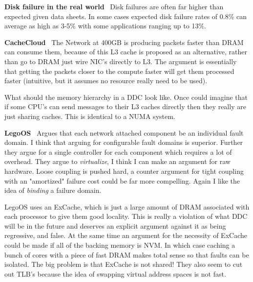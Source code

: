 \textbf{Disk failure in the real
world}~\cite{Schroeder:2007:DFR:1267903.1267904} Disk failures are often far
higher than expected given data sheets. In some cases expected disk failure
rates of 0.8\% can average as high as 3-5\% with some applications ranging up to
13\%.

\textbf{CacheCloud}~\cite{cachecloud} The Network at 400GB is producing packets faster than DRAM can consume them, because of this L3 cache is proposed as an alternative, rather than go to DRAM just wire NIC's directly to L3. The argument is essentially that getting the packets closer to the compute faster will get them processed faster (intuitive, but it assumes no resource really need to be used).

What should the memory hierarchy in a DDC look like. Once could imagine that if some CPU's can send messages to their L3 caches directly then they really are just sharing caches. This is identical to a NUMA system.


\textbf{LegoOS}~\cite{legoos} Argues that each network attached component be an
individual fault domain. I think that arguing for configurable fault domains is
superior. Further they argue for a single controller for each component which
requires a lot of overhead. They argue to \textit{virtualize}, I think I can
make an argument for raw hardware. Loose coupling is pushed hard, a counter
argument for tight coupling with an "amortized" failure cost could be far more
compelling. Again I like the idea of \textit{binding} a failure domain.

LegoOS uses an ExCache, which is just a large amount of DRAM associated with
each processor to give them good locality. This is really a violation of what
DDC will be in the future and deserves an explicit argument against it as
being regressive, and false. At the same time an argument for the necessity of
ExCache could be made if all of the backing memory is NVM. In which case
caching a bunch of cores with a piece of fast DRAM makes total sense so that
faults can be isolated. The big problem is that ExCache is not shared! They
also seem to cut out TLB's because the idea of swapping virtual address spaces
is not fast.

